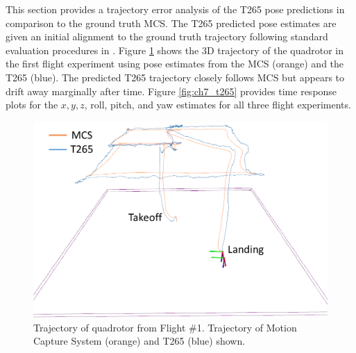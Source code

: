 This section provides a trajectory error analysis of the T265 pose predictions in comparison to the ground truth \ac{MCS}. The T265 predicted pose estimates are given an initial alignment to the ground truth trajectory following standard evaluation procedures in \cite{zhang_tutorial_2018}. Figure \ref{fig:ch7_flight_path_3d} shows the 3D trajectory of the quadrotor in the first flight experiment using pose estimates from the \ac{MCS} (orange) and the T265 (blue). The predicted T265 trajectory closely follows \ac{MCS} but appears to drift away marginally after time. Figure \ref{fig:ch7_t265} provides time response plots for the $x, y, z$, roll, pitch, and yaw estimates for all three flight experiments.

\begin{figure}[!ht]
    \centering  
    \includegraphics[page=1,clip,trim=0cm 0cm 0cm 0cm,width=.45\linewidth]{chapter_7_experiments/imgs/flight_path_t265_mcs.pdf}
    \caption[Trajectory of quadrotor from flight \#1 ]{Trajectory of quadrotor from Flight \#1. Trajectory of Motion Capture System (orange) and T265 (blue) shown. }\label{fig:ch7_flight_path_3d}
\end{figure}

